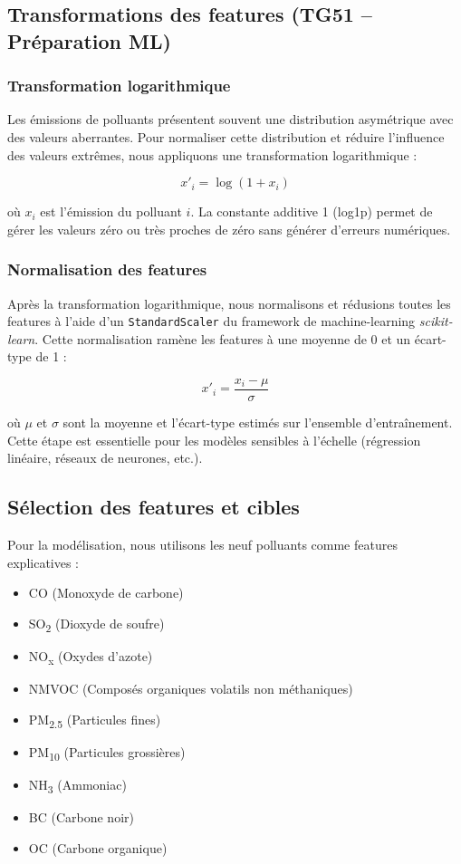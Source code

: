 \documentclass[11pt,a4paper]{article}
\begin{document}
\subsection{Transformations des features (TG51 -- Préparation ML)}

\subsubsection{Transformation logarithmique}

Les émissions de polluants présentent souvent une distribution asymétrique avec des valeurs aberrantes. Pour normaliser cette distribution et réduire l'influence des valeurs extrêmes, nous appliquons une transformation logarithmique :

\[
x'_i = \log(1 + x_i)
\]

où $x_i$ est l'émission du polluant $i$. La constante additive 1 (log1p) permet de gérer les valeurs zéro ou très proches de zéro sans générer d'erreurs numériques.

\subsubsection{Normalisation des features}

Après la transformation logarithmique, nous normalisons et rédusions toutes les features à l'aide d'un \lstinline{StandardScaler} du framework de machine-learning \emph{scikit-learn}. Cette normalisation ramène les features à une moyenne de 0 et un écart-type de 1 :

\[
x'_i = \frac{x_i - \mu}{\sigma}
\]

où $\mu$ et $\sigma$ sont la moyenne et l'écart-type estimés sur l'ensemble d'entraînement. Cette étape est essentielle pour les modèles sensibles à l'échelle (régression linéaire, réseaux de neurones, etc.).

\clearpage
\subsection{Sélection des features et cibles}

Pour la modélisation, nous utilisons les neuf polluants comme features explicatives :
\begin{itemize}[noitemsep]
    \item CO (Monoxyde de carbone)
    \item SO\textsubscript{2} (Dioxyde de soufre)
    \item NO\textsubscript{x} (Oxydes d'azote)
    \item NMVOC (Composés organiques volatils non méthaniques)
    \item PM\textsubscript{2.5} (Particules fines)
    \item PM\textsubscript{10} (Particules grossières)
    \item NH\textsubscript{3} (Ammoniac)
    \item BC (Carbone noir)
    \item OC (Carbone organique)
\end{itemize}
\end{document}
